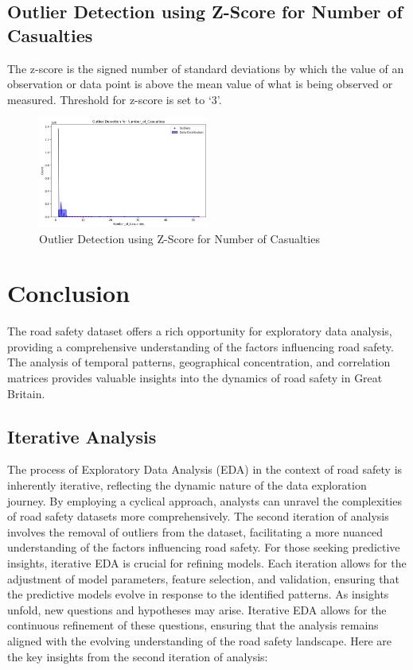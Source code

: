 \documentclass{article}
\begin{document}
\subsection{Outlier Detection using Z-Score for Number of Casualties}
The z-score is the signed number of standard deviations by which the value of an observation or data point is
above the mean value of what is being observed or measured. Threshold for z-score is set to `3'.

\begin{figure}[ht]
  \centering
  \includegraphics[width=0.5\textwidth]{Images/outlier_detection.png}
  \caption{Outlier Detection using Z-Score for Number of Casualties}
\end{figure}

\section{Conclusion}
The road safety dataset offers a rich opportunity for exploratory data analysis, providing a comprehensive
understanding of the factors influencing road safety. The analysis of temporal patterns, geographical
concentration, and correlation matrices provides valuable insights into the dynamics of road safety in Great
Britain.

\subsection{Iterative Analysis}
The process of Exploratory Data Analysis (EDA) in the context of road safety is inherently iterative, reflecting
the dynamic nature of the data exploration journey. By employing a cyclical approach, analysts can unravel the
complexities of road safety datasets more comprehensively. The second iteration of analysis involves the removal
of outliers from the dataset, facilitating a more nuanced understanding of the factors influencing road safety.
For those seeking predictive insights, iterative EDA is crucial for refining models. Each iteration allows for
the adjustment of model parameters, feature selection, and validation, ensuring that the predictive models
evolve in response to the identified patterns. As insights unfold, new questions and hypotheses may arise.
Iterative EDA allows for the continuous refinement of these questions, ensuring that the analysis remains
aligned with the evolving understanding of the road safety landscape. Here are the key insights from the
second iteration of analysis:
\end{document}
